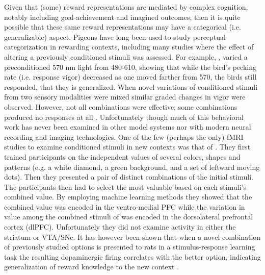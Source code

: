 \documentclass[doc,12pt]{apa}        %
\begin{document}
Given that (some) reward representations are mediated by complex cognition, notably including goal-achievement and imagined outcomes,  then it is quite possible that these same reward representations may have a categorical (i.e. generalizable) aspect.  Pigeons have long been used to study perceptual categorization in rewarding contexts, including many studies where the effect of altering a previously conditioned stimuli was assessed.  For example, , varied a preconditioned 570 nm light from 480-610, showing that while the bird's pecking rate (i.e. response vigor) decreased as one moved farther from 570, the birds still responded, that they is generalized.  When novel variations of conditioned stimuli from two sensory modalities were mixed similar graded changes in vigor were observed. However, not all combinations were effective; some combinations produced no responses at all \cite{Blough:2001p8408,Simmons:2008p8405,Urcuioli:2001p8359}.  Unfortunately though much of this behavioral work has never been examined in other model systems nor with modern neural recording and imaging technologies.  One of the few (perhaps the only) fMRI studies to examine conditioned stimuli in new contexts was that of . They first trained participants on the independent values of several colors, shapes and patterns (e.g. a white diamond, a green background, and a set of leftward moving dots).  Then they presented a pair of distinct combinations of the initial stimuli.  The participants then had to select the most valuable based on each stimuli's combined value.  By employing machine learning methods they showed that the combined value was encoded in the ventro-medial PFC while the variation in value among the combined stimuli of was encoded in the dorsolateral prefrontal cortex (dlPFC).  Unfortunately they did not examine activity in either the striatum or VTA/SNc.  It has however been shown that when a novel combination of previously studied options is presented to rats in a stimulus-response learning task the resulting dopaminergic firing correlates with the better option, indicating generalization of reward knowledge to the new context \cite{Roesch:2007p2519}.

\end{document}
